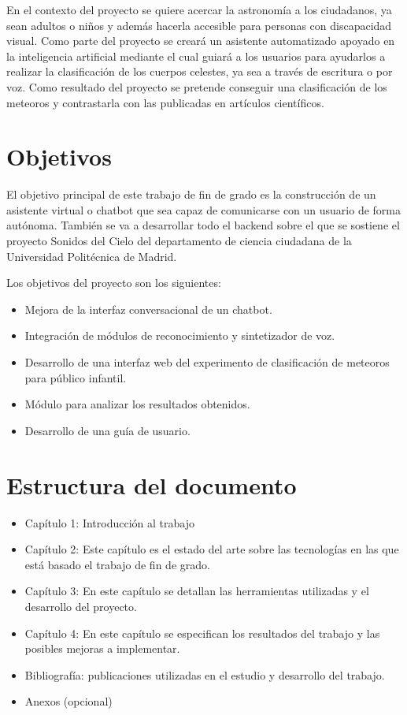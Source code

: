 \vspace{0.5cm}

En el contexto del proyecto se quiere acercar la astronomía a los ciudadanos, ya sean adultos o niños y además hacerla accesible para personas con discapacidad visual. Como parte del proyecto se creará un asistente automatizado apoyado en la inteligencia artificial mediante el cual guiará a los usuarios para ayudarlos a realizar la clasificación de los cuerpos celestes, ya sea a través de escritura o por voz.
Como resultado del proyecto se pretende conseguir una clasificación de los meteoros y contrastarla con las publicadas en artículos científicos.


\section{Objetivos}

El objetivo principal de este trabajo de fin de grado es la construcción de un asistente virtual o chatbot que sea capaz de comunicarse con un usuario de forma autónoma. También se va a desarrollar todo el backend sobre el que se sostiene el proyecto Sonidos del Cielo del departamento de ciencia ciudadana de la Universidad Politécnica de Madrid.

Los objetivos del proyecto son los siguientes:

\begin{itemize}
    \item Mejora de la interfaz conversacional de un chatbot.
    \item Integración de módulos de reconocimiento y sintetizador de voz.
    \item Desarrollo de una interfaz web del experimento de clasificación de meteoros para público infantil.
    \item Módulo para analizar los resultados obtenidos.
    \item Desarrollo de una guía de usuario.
\end{itemize}

\section{Estructura del documento}

\begin{itemize}
\item Capítulo 1: Introducción al trabajo
\item Capítulo 2: Este capítulo es el estado del arte sobre las tecnologías en las que está basado el trabajo de fin de grado. 
\item Capítulo 3: En este capítulo se detallan las herramientas utilizadas y el desarrollo del proyecto.
\item Capítulo 4: En este capítulo se especifican los resultados del trabajo y las posibles mejoras a implementar.
\item Bibliografía: publicaciones utilizadas en el estudio y desarrollo del trabajo.
\item Anexos (opcional)
\end{itemize}
